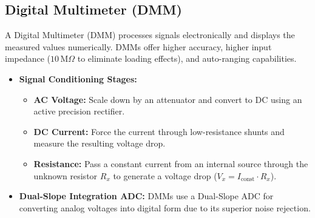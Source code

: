 \documentclass[12pt,a4paper]{article}
\begin{document}
\subsection{Digital Multimeter (DMM)}
A Digital Multimeter (DMM) processes signals electronically and displays the measured values numerically. DMMs offer higher accuracy, higher input impedance ($10\,\text{M}\Omega$ to eliminate loading effects), and auto-ranging capabilities.

\begin{itemize}[leftmargin=*, itemsep=3.5pt]
  \item \textbf{Signal Conditioning Stages:}
    \begin{itemize}[leftmargin=*, itemsep=2.5pt, topsep=0pt]
      \item \textbf{AC Voltage:} Scale down by an attenuator and convert to DC using an active precision rectifier.
      \item \textbf{DC Current:} Force the current through low-resistance shunts and measure the resulting voltage drop.
      \item \textbf{Resistance:} Pass a constant current from an internal source through the unknown resistor $R_x$ to generate a voltage drop ($V_x = I_{\text{const}} \cdot R_x$).
    \end{itemize}
  \item \textbf{Dual-Slope Integration ADC:} DMMs use a Dual-Slope ADC for converting analog voltages into digital form due to its superior noise rejection.
\end{itemize}
\end{document}

